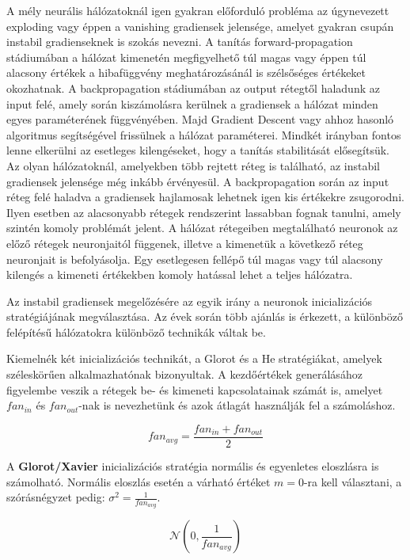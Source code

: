 
A mély neurális hálózatoknál igen gyakran előforduló probléma az úgynevezett exploding vagy éppen a vanishing gradiensek jelensége, amelyet gyakran csupán instabil gradienseknek is szokás nevezni.
A tanítás forward-propagation stádiumában a hálózat kimenetén megfigyelhető túl magas vagy éppen túl alacsony értékek a hibafüggvény meghatározásánál is szélsőséges értékeket okozhatnak.
A backpropagation stádiumában az output rétegtől haladunk az input felé, amely során kiszámolásra kerülnek a gradiensek a hálózat minden egyes paraméterének függvényében. Majd Gradient Descent vagy ahhoz hasonló algoritmus segítségével frissülnek a hálózat paraméterei. Mindkét irányban fontos lenne elkerülni az esetleges kilengéseket, hogy a tanítás stabilitását elősegítsük.
Az olyan hálózatoknál, amelyekben több rejtett réteg is található, az instabil gradiensek jelensége még inkább érvényesül. A backpropagation során az input réteg felé haladva a gradiensek hajlamosak lehetnek igen kis értékekre zsugorodni. Ilyen esetben az alacsonyabb rétegek rendszerint lassabban fognak tanulni, amely szintén komoly problémát jelent.
A hálózat rétegeiben megtalálható neuronok az előző rétegek neuronjaitól függenek, illetve a kimenetük a következő réteg neuronjait is befolyásolja. Egy esetlegesen fellépő túl magas vagy túl alacsony kilengés a kimeneti értékekben komoly hatással lehet a teljes hálózatra.

Az instabil gradiensek megelőzésére az egyik irány a neuronok inicializációs stratégiájának megválasztása.
Az évek során több ajánlás is érkezett, a különböző felépítésű hálózatokra különböző technikák váltak be.

Kiemelnék két inicializációs technikát, a Glorot \cite{glorot2010understanding} és a He \cite{he2015delving} stratégiákat, amelyek széleskörűen alkalmazhatónak bizonyultak.
A kezdőértékek generálásához figyelembe veszik a rétegek be- és kimeneti kapcsolatainak számát is, amelyet $fan_{in}$ és $fan_{out}$-nak is nevezhetünk és azok átlagát használják fel a számoláshoz.

$$fan_{avg} = \frac{fan_{in} + fan_{out}}{2}$$

A \textbf{Glorot/Xavier} inicializációs stratégia normális és egyenletes eloszlásra is számolható.
Normális eloszlás esetén a várható értéket $m = 0$-ra kell választani, a szórásnégyzet pedig: $ \sigma^2 = \frac{1}{fan_{avg}} $.

$$ \mathcal{N}(0, \frac{1}{fan_{avg}}) $$

